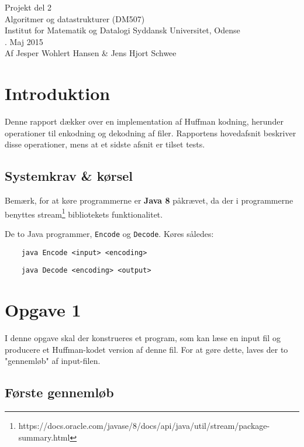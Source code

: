 \documentclass{article}
\begin{document}
{\centering
\huge
Projekt del 2\\
Algoritmer og datastrukturer (DM507)\\
\large
\bigskip
Institut for Matematik og Datalogi Syddansk Universitet, Odense\\
. Maj 2015\\
\bigskip
Af Jesper Wohlert Hansen \& Jens Hjort Schwee\\
}
\newpage

\section*{Introduktion}
Denne rapport dækker over en implementation af Huffman kodning, herunder operationer til enkodning og dekodning af filer. Rapportens hovedafsnit beskriver disse operationer, mens at et sidste afsnit er tilset tests.

\subsection*{Systemkrav \& kørsel}
Bemærk, for at køre programmerne er \textbf{Java 8} påkrævet, da der i programmerne benyttes stream\footnote{https://docs.oracle.com/javase/8/docs/api/java/util/stream/package-summary.html} bibliotekets funktionalitet.

\bigskip

De to Java programmer, \texttt{Encode} og \texttt{Decode}. Køres således:

\begin{verbatim}
    java Encode <input> <encoding>
\end{verbatim}

\begin{verbatim}
    java Decode <encoding> <output>
\end{verbatim}

\newpage

\section*{Opgave 1}
I denne opgave skal der konstrueres et program, som kan læse en input fil og producere et Huffman-kodet version af denne fil. For at gøre dette, laves der to "gennemløb" af input-filen.

\subsection*{Første gennemløb}
\end{document}
